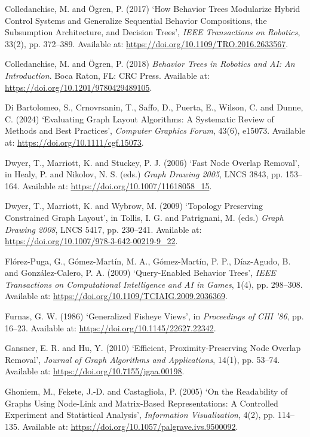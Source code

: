 \documentclass[11pt,a4paper,oneside,extrafontsizes]{memoir}
\begin{document}
Colledanchise, M. and Ögren, P. (2017) ‘How Behavior Trees Modularize Hybrid Control Systems and Generalize Sequential Behavior Compositions, the Subsumption Architecture, and Decision Trees’, \emph{IEEE Transactions on Robotics}, 33(2), pp. 372–389. Available at: \href{https://doi.org/10.1109/TRO.2016.2633567}{https://doi.org/10.1109/TRO.2016.2633567}.

Colledanchise, M. and Ögren, P. (2018) \emph{Behavior Trees in Robotics and AI: An Introduction}. Boca Raton, FL: CRC Press. Available at: \href{https://doi.org/10.1201/9780429489105}{https://doi.org/10.1201/9780429489105}.

Di Bartolomeo, S., Crnovrsanin, T., Saffo, D., Puerta, E., Wilson, C. and Dunne, C. (2024) ‘Evaluating Graph Layout Algorithms: A Systematic Review of Methods and Best Practices’, \emph{Computer Graphics Forum}, 43(6), e15073. Available at: \href{https://doi.org/10.1111/cgf.15073}{https://doi.org/10.1111/cgf.15073}.

Dwyer, T., Marriott, K. and Stuckey, P. J. (2006) ‘Fast Node Overlap Removal’, in Healy, P. and Nikolov, N. S. (eds.) \emph{Graph Drawing 2005}, LNCS 3843, pp. 153–164. Available at: \href{https://doi.org/10.1007/11618058\_15}{https://doi.org/10.1007/11618058\_15}.

Dwyer, T., Marriott, K. and Wybrow, M. (2009) ‘Topology Preserving Constrained Graph Layout’, in Tollis, I. G. and Patrignani, M. (eds.) \emph{Graph Drawing 2008}, LNCS 5417, pp. 230–241. Available at: \href{https://doi.org/10.1007/978-3-642-00219-9\_22}{https://doi.org/10.1007/978-3-642-00219-9\_22}.

Flórez-Puga, G., Gómez-Martín, M. A., Gómez-Martín, P. P., Díaz-Agudo, B. and González-Calero, P. A. (2009) ‘Query-Enabled Behavior Trees’, \emph{IEEE Transactions on Computational Intelligence and AI in Games}, 1(4), pp. 298–308. Available at: \href{https://doi.org/10.1109/TCIAIG.2009.2036369}{https://doi.org/10.1109/TCIAIG.2009.2036369}.

Furnas, G. W. (1986) ‘Generalized Fisheye Views’, in \emph{Proceedings of CHI ’86}, pp. 16–23. Available at: \href{https://doi.org/10.1145/22627.22342}{https://doi.org/10.1145/22627.22342}.

Gansner, E. R. and Hu, Y. (2010) ‘Efficient, Proximity-Preserving Node Overlap Removal’, \emph{Journal of Graph Algorithms and Applications}, 14(1), pp. 53–74. Available at: \href{https://doi.org/10.7155/jgaa.00198}{https://doi.org/10.7155/jgaa.00198}.

Ghoniem, M., Fekete, J.-D. and Castagliola, P. (2005) ‘On the Readability of Graphs Using Node-Link and Matrix-Based Representations: A Controlled Experiment and Statistical Analysis’, \emph{Information Visualization}, 4(2), pp. 114–135. Available at: \href{https://doi.org/10.1057/palgrave.ivs.9500092}{https://doi.org/10.1057/palgrave.ivs.9500092}.
\end{document}
